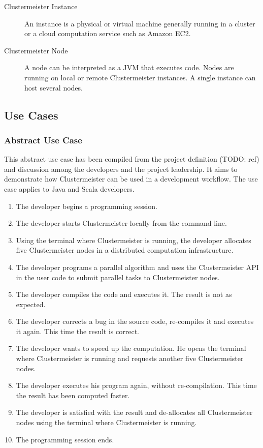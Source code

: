 \documentclass[english]{uzhpub}
\begin{document}
\begin{description}
\item[Clustermeister Instance] An instance is a physical or virtual machine generally running in a cluster or a cloud computation service such as Amazon EC2.
\item[Clustermeister Node] A node can be interpreted as a JVM that executes code. Nodes are running on local or remote Clustermeister instances. A single instance can host several nodes.
\end{description}

\subsection{Use Cases}

\subsubsection*{Abstract Use Case}
This abstract use case has been compiled from the project definition (TODO: ref) and discussion among the developers and the project leadership. It aims to demonstrate how Clustermeister can be used in a development workflow. The use case applies to Java and Scala developers.

\begin{enumerate}
\item \label{uc:start}The developer begins a programming session.
\item The developer starts Clustermeister locally from the command line.
\item \label{uc:alloc}Using the terminal where Clustermeister is running, the developer allocates five Clustermeister nodes in a distributed computation infrastructure.
\item \label{uc:prog}The developer programs a parallel algorithm and uses the Clustermeister API in the user code to submit parallel tasks to Clustermeister nodes.
\item The developer compiles the code and executes it. The result is not as expected.
\item The developer corrects a bug in the source code, re-compiles it and executes it again. This time the result is correct.
\item The developer wants to speed up the computation. He opens the terminal where Clustermeister is running and requests another five Clustermeister nodes.
\item The developer executes his program again, without re-compilation. This time the result has been computed faster.
\item The developer is satisfied with the result and de-allocates all Clustermeister nodes using the terminal where Clustermeister is running.
\item The programming session ends.
\end{enumerate}
\end{document}
